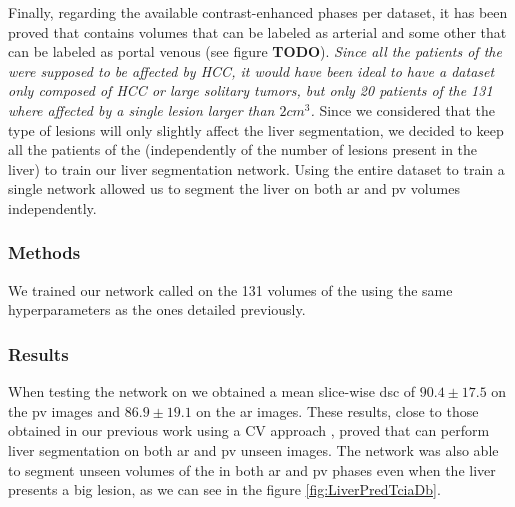 {\begin{figure}[!ht]
\begin{mdframed}[backgroundcolor=blue!50,linecolor=blue!50]
		\label{fig:cirrhosisPlot}
	\end{mdframed}
\end{figure}
Finally, regarding the available contrast-enhanced phases per dataset, it has been proved that \textbf{} contains volumes that can be labeled as arterial and some other that can be labeled as portal venous (see figure \textbf{TODO}).
\textit{Since all the patients of the \textbf{} were supposed to be affected by HCC, it would have been ideal to have a dataset only composed of HCC or large solitary tumors, but only 20 patients of the 131 where affected by a single lesion larger than $ 2cm^3 $. }
Since we considered that the type of lesions will only slightly affect the liver segmentation, we decided to keep all the patients of the \textbf{} (independently of the number of lesions present in the liver) to train our liver segmentation network. Using the entire dataset to train a single network allowed us to segment the liver on both \ac{ar} and \ac{pv} volumes independently.
}

\subsubsection{Methods}\label{liver_segmentation_tcia_db_methods}
We trained our network called  on the 131 volumes of the
\textbf{} using the same hyperparameters as the ones detailed
previously. 

\subsubsection{Results}\label{liver_segmentation_tcia_db_results}

When testing the  network on \textbf{} we
obtained a mean slice-wise \ac{dsc} of $ 90.4 \pm 17.5 $ on the \ac{pv} images and
$ 86.9 \pm 19.1 $ on the \ac{ar} images. These results, close to those obtained
in our previous work using a CV approach \cite{Ouhmich2019}, proved that  can
perform liver segmentation on both \ac{ar} and \ac{pv} unseen images.
The  network was also able to segment unseen volumes of the
\textbf{} in both \ac{ar} and \ac{pv} phases even when the liver presents a big
lesion, as we can see in the figure \ref{fig:LiverPredTciaDb}.


